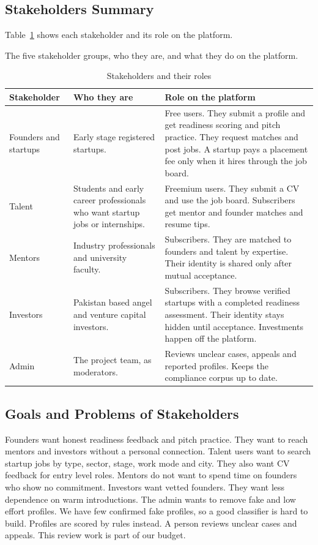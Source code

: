 \documentclass{FastFyp}
\makeatletter
\newcommand{\capdesc}[1]{%
  \par\nobreak
  \begingroup
  \setstretch{1}%
  \ifdefstring{\@captype}{figure}%
    {\vspace{0.2\baselineskip}}%
    {\vspace{-0.8\baselineskip}}%
  {\centering\normalfont\itshape\small
   \begin{minipage}{0.92\textwidth}\centering #1\end{minipage}\par}%
  \endgroup
  \vspace{0.4\baselineskip}%
}
\makeatother
\begin{document}
\subsection{Stakeholders Summary}
Table~\ref{tab:stakeholders} shows each stakeholder and its role on the platform.
\begin{table}[!ht]
\centering
\caption{Stakeholders and their roles}
\capdesc{The five stakeholder groups, who they are, and what they do on the platform.}
\label{tab:stakeholders}
\begin{tabular}{|p{2.3cm}|p{5.4cm}|p{6.4cm}|}
\hline
\textbf{Stakeholder} & \textbf{Who they are} & \textbf{Role on the platform} \\
\hline
Founders and startups & Early stage registered startups. & Free users. They submit a profile and get readiness scoring and pitch practice. They request matches and post jobs. A startup pays a placement fee only when it hires through the job board. \\ \hline
Talent & Students and early career professionals who want startup jobs or internships. & Freemium users. They submit a CV and use the job board. Subscribers get mentor and founder matches and resume tips. \\ \hline
Mentors & Industry professionals and university faculty. & Subscribers. They are matched to founders and talent by expertise. Their identity is shared only after mutual acceptance. \\ \hline
Investors & Pakistan based angel and venture capital investors. & Subscribers. They browse verified startups with a completed readiness assessment. Their identity stays hidden until acceptance. Investments happen off the platform. \\ \hline
Admin & The project team, as moderators. & Reviews unclear cases, appeals and reported profiles. Keeps the compliance corpus up to date. \\ \hline
\end{tabular}
\end{table}

\subsection{Goals and Problems of Stakeholders}
Founders want honest readiness feedback and pitch practice. They want to reach mentors and investors without a personal connection. Talent users want to search startup jobs by type, sector, stage, work mode and city. They also want CV feedback for entry level roles. Mentors do not want to spend time on founders who show no commitment. Investors want vetted founders. They want less dependence on warm introductions. The admin wants to remove fake and low effort profiles. We have few confirmed fake profiles, so a good classifier is hard to build. Profiles are scored by rules instead. A person reviews unclear cases and appeals. This review work is part of our budget.
\end{document}
